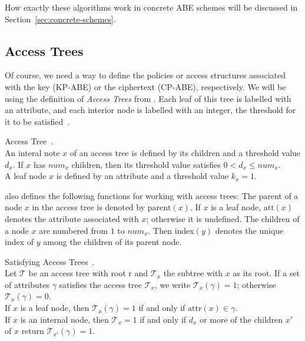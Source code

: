 How exactly these algorithms work in concrete ABE schemes will be discussed in Section~\ref{sec:concrete-schemes}.

\subsection{Access Trees}
Of course, we need a way to define the policies or access structures associated with the key (KP-ABE) or the ciphertext (CP-ABE), respectively.
We will be using the definition of \emph{Access Trees} from \cite{goyal_attribute-based_2006}.
Each leaf of this tree is labelled with an attribute, and each interior node is labelled with an integer, the threshold for it to be satisfied~\cite{goyal_attribute-based_2006}.
\begin{definition}
    Access Tree~\cite{goyal_attribute-based_2006}.\\
    An interal note $x$ of an access tree is defined by its children and a threshold value $d_x$. If $x$ has $num_x$ children, then its threshold value satisfies $0 < d_x \leq num_x$.\\
    A leaf node $x$ is defined by an attribute and a threshold value $k_x = 1$.

    \cite{goyal_attribute-based_2006} also defines the following functions for working with access trees:
    The parent of a node $x$ in the access tree is denoted by $\text{parent}(x)$.
    If $x$ is a leaf node, $\text{att}(x)$ denotes the attribute associated with $x$; otherwise it is undefined.
    The children of a node $x$ are numbered from $1$ to $num_x$. Then $\text{index}(y)$ denotes the unique index of $y$ among the children of its parent node.
\end{definition}

\begin{definition}
    Satisfying Access Trees~\cite{goyal_attribute-based_2006}.\\
    Let $\mathcal{T}$ be an access tree with root r and $\mathcal{T}_x$ the subtree with $x$ as its root.
    If a set of attributes $\gamma$ satisfies the access tree $\mathcal{T}_x$, we write $\mathcal{T}_x(\gamma) = 1$; otherwise $\mathcal{T}_x(\gamma) = 0$.\\
    If $x$ is a leaf node, then $\mathcal{T}_x(\gamma) = 1$ if and only if $\text{attr}(x) \in \gamma$.\\
    If $x$ is an internal node, then $\mathcal{T}_x = 1$ if and only if $d_x$ or more of the children $x'$ of $x$ return $\mathcal{T}_{x'}(\gamma) = 1$.
\end{definition}

